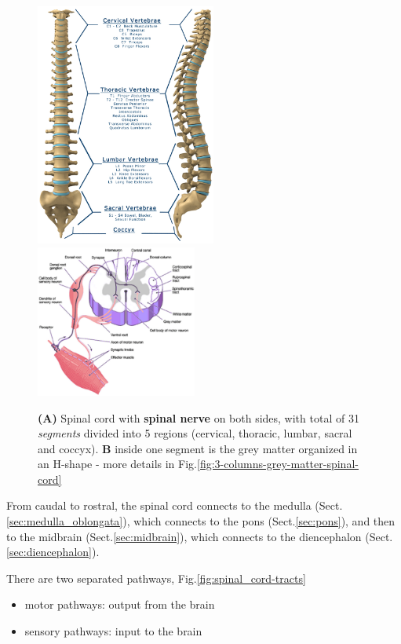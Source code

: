  \begin{figure}[hbt]
  \centerline{
  \includegraphics[height=8cm,
    angle=0]{./images/spinal_cord_02.eps}
    \includegraphics[height=5cm,
    angle=0]{./images/spinal_cord_crosssection.eps}}
\caption{{\bf (A)} Spinal cord with {\bf spinal nerve} on both sides, with total
of 31 {\it segments} divided into 5 regions (cervical, thoracic, lumbar,
sacral and coccyx). {\bf B} inside one segment is the grey matter
organized in an H-shape - more details in Fig.\ref{fig:3-columns-grey-matter-spinal-cord} }
\label{fig:spinal_cord}
\end{figure}


 
From caudal to rostral, the spinal cord connects to the medulla
(Sect.\ref{sec:medulla_oblongata}), which connects to the pons
(Sect.\ref{sec:pons}), and then to the midbrain (Sect.\ref{sec:midbrain}), which
connects to the diencephalon (Sect.\ref{sec:diencephalon}).

There are two separated pathways,
Fig.\ref{fig:spinal_cord-tracts}
\begin{itemize}
  \item motor pathways: output from the brain
  \item sensory pathways: input to the brain
\end{itemize}


